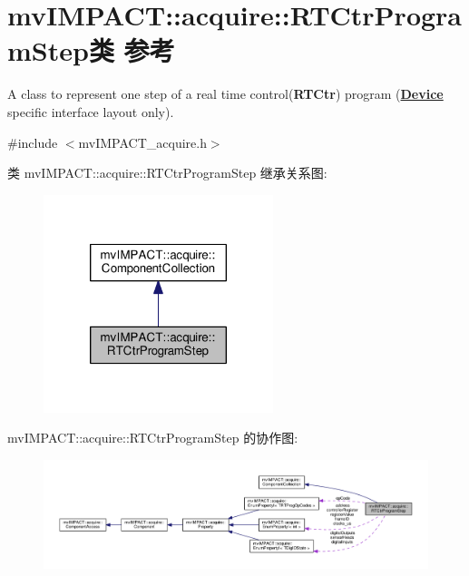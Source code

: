 \hypertarget{classmv_i_m_p_a_c_t_1_1acquire_1_1_r_t_ctr_program_step}{\section{mv\+I\+M\+P\+A\+C\+T\+:\+:acquire\+:\+:R\+T\+Ctr\+Program\+Step类 参考}
\label{classmv_i_m_p_a_c_t_1_1acquire_1_1_r_t_ctr_program_step}
}


A class to represent one step of a real time control({\bfseries R\+T\+Ctr}) program ({\bfseries \hyperlink{classmv_i_m_p_a_c_t_1_1acquire_1_1_device}{Device}} specific interface layout only).  




{\ttfamily \#include $<$mv\+I\+M\+P\+A\+C\+T\+\_\+acquire.\+h$>$}



类 mv\+I\+M\+P\+A\+C\+T\+:\+:acquire\+:\+:R\+T\+Ctr\+Program\+Step 继承关系图\+:
\nopagebreak
\begin{figure}[H]
\begin{center}
\leavevmode
\includegraphics[width=190pt]{classmv_i_m_p_a_c_t_1_1acquire_1_1_r_t_ctr_program_step__inherit__graph}
\end{center}
\end{figure}


mv\+I\+M\+P\+A\+C\+T\+:\+:acquire\+:\+:R\+T\+Ctr\+Program\+Step 的协作图\+:
\nopagebreak
\begin{figure}[H]
\begin{center}
\leavevmode
\includegraphics[width=350pt]{classmv_i_m_p_a_c_t_1_1acquire_1_1_r_t_ctr_program_step__coll__graph}
\end{center}
\end{figure}
